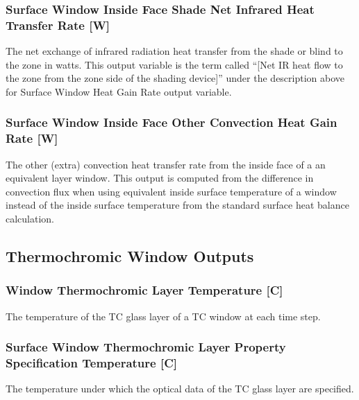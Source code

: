 \subsubsection{Surface Window Inside Face Shade Net Infrared Heat Transfer Rate {[}W{]}}\label{surface-window-inside-face-shade-net-infrared-heat-transfer-rate-w}

The net exchange of infrared radiation heat transfer from the shade or blind to the zone in watts. This output variable is the term called ``{[}Net IR heat flow to the zone from the zone side of the shading device{]}'' under the description above for Surface Window Heat Gain Rate output variable.

\subsubsection{Surface Window Inside Face Other Convection Heat Gain Rate {[}W{]}}\label{surface-window-inside-face-other-convection-heat-gain-rate-w}

The other (extra) convection heat transfer rate from the inside face of a an equivalent layer window. This output is computed from the difference in convection flux when using equivalent inside surface temperature of a window instead of the inside surface temperature from the standard surface heat balance calculation.

\subsection{Thermochromic Window Outputs}\label{thermochomic-window-outputs}

\subsubsection{Window Thermochromic Layer Temperature {[}C{]}}\label{window-thermochromic-layer-temperature-c}

The temperature of the TC glass layer of a TC window at each time step.

\subsubsection{Surface Window Thermochromic Layer Property Specification Temperature {[}C{]}}\label{surface-window-thermochromic-layer-property-specification-temperature-c-000}

The temperature under which the optical data of the TC glass layer are specified.

